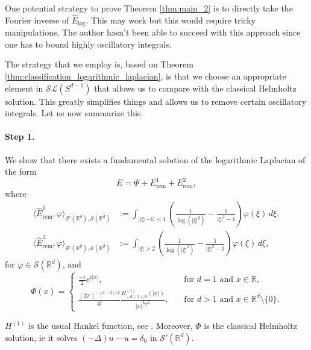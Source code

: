 \documentclass[11pt]{amsart}
\newcommand{\R}{\mathbb{R}}
\begin{document}
One potential strategy to prove Theorem \ref{thm:main_2} is to directly take the Fourier inverse of $\hat{E}_{\log}$. This may work but this would require tricky manipulations. The author hasn't been able to succeed with this approach since one has to bound highly oscillatory integrals. 

The strategy that we employ is, based on Theorem \ref{thm:classification_logarithmic_laplacian}, is that we choose an appropriate element in $\mathcal{SL}(S^{d-1})$ that allows us to compare with the classical Helmholtz solution. This greatly simplifies things and allows us to remove certain oscillatory integrals. Let us now summarize this. 

\paragraph{Step 1.}

We show that there exists a fundamental solution of the logarithmic Laplacian of the form 
\begin{equation*}
	E=\Phi+E_{\text{rem}}^{1}+E_{\text{rem}}^{2}, 
\end{equation*}
where 
        \begin{equation*}
            \begin{split}
                \langle \hat{E}^1_{\text{rem}},\varphi\rangle_{\mathcal{S}'(\R^d),\mathcal{S}(\R^d)}&:=\int_{||\xi|-1|<1}\left (\frac{1}{\log(|\xi|^2)}-\frac{1}{|\xi|^2-1}\right )\varphi(\xi)\,d\xi,\\
                \langle \hat{E}^2_{\text{rem}},\varphi\rangle_{\mathcal{S}'(\R^d),\mathcal{S}(\R^d)}&:=\int_{|\xi|>2}\left (\frac{1}{\log(|\xi|^2)}-\frac{1}{|\xi|^2-1}\right )\varphi(\xi)\,d\xi,
            \end{split}
        \end{equation*}
        for $\varphi \in\mathcal{S}(\R^d)$, and 
\begin{equation}\label{eqn:helmholtz_soln}
        \Phi(x)=
        \begin{cases}
            \displaystyle\frac{-i}{2}e^{i|x|}, \quad &\text{for $d=1$ and $x\in \R$, }\\
            \displaystyle\frac{(2\pi)^{-(d-2)/2}}{4i}\frac{H^{(1)}_{(d-2)/2}(|x|)}{|x|^{\tfrac{d-2}{2}}}, \quad &\text{for $d>1$ and $x\in \R^{d}\setminus \{0\}$.}
        \end{cases}
        \end{equation}

$H^{(1)}$ is the usual Hankel function, see \cite[Chapter 14, Section 10]{MR3887685}. Moreover, $\Phi$ is the classical Helmholtz solution, ie it solves $(-\Delta)u-u=\delta_0$ in $\mathcal{S}'(\R^d)$. 
\end{document}
